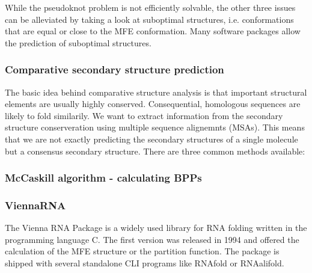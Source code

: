 While the pseudoknot problem is not efficiently solvable, the other three issues can be alleviated by taking a look at suboptimal structures, i.e. conformations that are equal or close to the MFE conformation. Many software packages allow the prediction of suboptimal structures. 

 
\subsubsection{Comparative secondary structure prediction}
The basic idea behind comparative structure analysis is that important structural elements are usually highly conserved. Consequential, homologous sequences are likely to fold similarily. We want to extract information from the secondary structure conserveration using multiple sequence alignemnts (MSAs). This means that we are not exactly predicting the secondary structures of a single molecule but a consensus secondary structure. There are three common methods available: 


\subsubsection{McCaskill algorithm - calculating BPPs}


\subsubsection{ViennaRNA}
The Vienna RNA Package is a widely used library for RNA folding written in the programming language C. The first version was released in 1994 and offered the calculation of the MFE structure or the partition function. The package is shipped with several standalone CLI programs like RNAfold or RNAalifold. 



